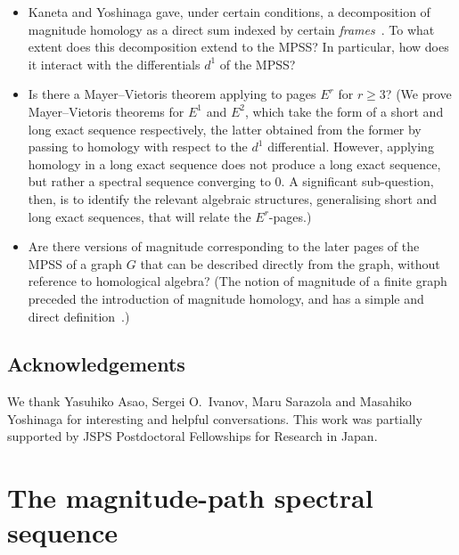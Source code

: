 \documentclass[a4paper, 11 pt, oneside, reqno]{amsart}
\numberwithin{lemma}{section}
\theoremstyle{definition}
\begin{document}
\begin{itemize}
    \item  Kaneta and Yoshinaga gave, under certain conditions,
    a decomposition of magnitude homology as a direct sum indexed
    by certain \emph{frames}~\cite[Theorem~3.12]{KanetaYoshinaga}.
    To what extent does this decomposition extend to the MPSS?
    In particular, how does it interact with the differentials $d^1$
    of the MPSS?

    \item Is there a Mayer--Vietoris theorem 
    applying to pages $E^r$ for $r\geq 3$?
    (We prove Mayer--Vietoris theorems for $E^1$ and $E^2$, which take the
    form of a short and long exact sequence respectively,
    the latter obtained from the former by passing to homology
    with respect to the $d^1$ differential.
    However, applying homology in a long exact sequence does not produce
    a long exact sequence, but rather a spectral sequence converging to $0$.
    A significant sub-question, then, is to identify the relevant 
    algebraic structures, generalising short and long exact sequences,
    that will relate the $E^r$-pages.)
    
    \item
    Are there versions of magnitude corresponding to the later pages
    of the MPSS of a graph $G$
    that can be described directly from the graph,
    without reference to homological algebra?
    (The notion of magnitude of a finite graph preceded the 
    introduction of magnitude homology,
    and has a simple and direct definition~\cite{LeinsterGraph}.)
\end{itemize}

\subsection*{Acknowledgements}
We thank Yasuhiko Asao, Sergei O.~Ivanov, Maru Sarazola and Masahiko Yoshinaga for interesting and helpful conversations.
This work was partially supported by JSPS Postdoctoral Fellowships for Research in Japan.
%

\section{The magnitude-path spectral sequence}\label{sec:MPS}
\end{document}
